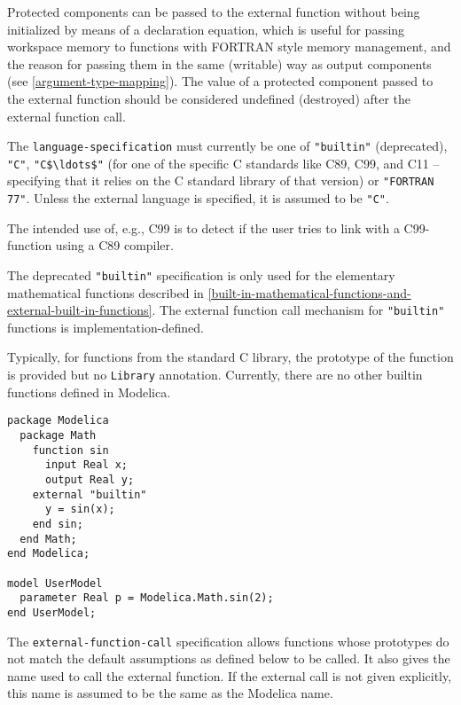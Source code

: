 Protected components can be passed to the external function without being initialized by means of a declaration equation, which is useful for passing workspace memory to functions with FORTRAN style memory management, and the reason for passing them in the same (writable) way as output components (see \cref{argument-type-mapping}).
The value of a protected component passed to the external function should be considered undefined (destroyed) after the external function call.

The {\lstinline[language=grammar]!language-specification!} must currently be one of {\lstinline!"builtin"!} (deprecated), {\lstinline!"C"!}, {\lstinline!"C$\ldots$"!} (for one of the specific C standards like C89, C99, and C11 -- specifying that it relies on the C standard library of that version) or {\lstinline!"FORTRAN 77"!}.
Unless the external language is specified, it is assumed to be {\lstinline!"C"!}.

\begin{nonnormative}
The intended use of, e.g., C99 is to detect if the user tries to link with a C99-function using a C89 compiler.
\end{nonnormative}

The deprecated {\lstinline!"builtin"!} specification is only used for the elementary mathematical functions described in \cref{built-in-mathematical-functions-and-external-built-in-functions}.
The external function call mechanism for {\lstinline!"builtin"!} functions is implementation-defined.

\begin{nonnormative}
Typically, for functions from the standard C library, the prototype of the function is provided but no {\lstinline!Library!} annotation.
Currently, there are no other builtin functions defined in Modelica.
\end{nonnormative}

\begin{example}
\begin{lstlisting}[language=modelica]
package Modelica
  package Math
    function sin
      input Real x;
      output Real y;
    external "builtin"
      y = sin(x);
    end sin;
  end Math;
end Modelica;

model UserModel
  parameter Real p = Modelica.Math.sin(2);
end UserModel;
\end{lstlisting}
\end{example}

The {\lstinline[language=grammar]!external-function-call!} specification allows functions whose prototypes do not match the default assumptions as defined below to be called.
It also gives the name used to call the external function.
If the external call is not given explicitly, this name is assumed to be the same as the Modelica name.


